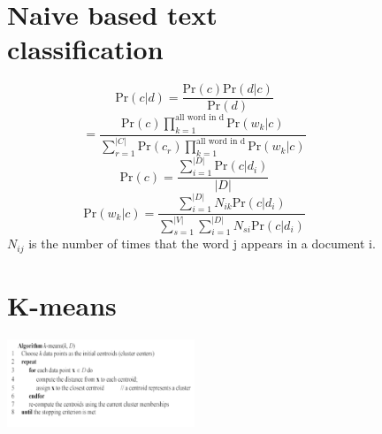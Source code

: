 \documentclass[10pt,oneside,a4paper]{article}
\begin{document}
\begin{figure}[H]
    \centering
    \begin{minipage}{0.5\textwidth}
        \section{Naive based text classification}

        \[
            \text{Pr}(c | d) = \frac{\text{Pr}(c) \text{Pr}(d|c)}{\text{Pr}(d)}
        \]
        \[
            = \frac{\text{Pr}(c) \prod_{k=1}^{\text{all word in d}} \text{Pr}(w_k|c)}{\sum_{r=1}^{|C|} \text{Pr}(c_r) \prod_{k=1}^{\text{all word in d}} \text{Pr}(w_k|c)}
        \]
        \[
            \text{Pr}(c) = \frac{\sum_{i=1}^{|D|} \text{Pr}(c|d_i)}{|D|}
        \]
        \[
            \text{Pr}(w_k|c) = \frac{\sum_{i=1}^{|D|} N_{ik} \text{Pr}(c|d_i)}{\sum_{s=1}^{|V|} \sum_{i=1}^{|D|} N_{si} \text{Pr}(c|d_i)}
        \]
        $N_{ij}$ is the number of times that the word j appears in a document i.
    \end{minipage}%
    \hfill %
    \begin{minipage}{0.5\textwidth}
        \section{K-means}
        \centering
        \includegraphics[width=0.5\textwidth]{Images/kmeans.png}

    \end{minipage}
\end{figure}
\end{document}
